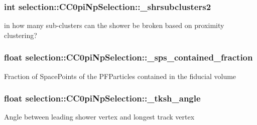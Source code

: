 \subsubsection[{\texorpdfstring{\+\_\+shrsubclusters2}{_shrsubclusters2}}]{\setlength{\rightskip}{0pt plus 5cm}int selection\+::\+C\+C0pi\+Np\+Selection\+::\+\_\+shrsubclusters2\hspace{0.3cm}{\ttfamily [private]}}\hypertarget{classselection_1_1CC0piNpSelection_af7e0f3d1bd6c4335353bd8d4054d4e1e}{}\label{classselection_1_1CC0piNpSelection_af7e0f3d1bd6c4335353bd8d4054d4e1e}
in how many sub-\/clusters can the shower be broken based on proximity clustering? 
\subsubsection[{\texorpdfstring{\+\_\+sps\+\_\+contained\+\_\+fraction}{_sps_contained_fraction}}]{\setlength{\rightskip}{0pt plus 5cm}float selection\+::\+C\+C0pi\+Np\+Selection\+::\+\_\+sps\+\_\+contained\+\_\+fraction\hspace{0.3cm}{\ttfamily [private]}}\hypertarget{classselection_1_1CC0piNpSelection_ac425fa284847d7cae95f21367ed4889e}{}\label{classselection_1_1CC0piNpSelection_ac425fa284847d7cae95f21367ed4889e}
Fraction of Space\+Points of the P\+F\+Particles contained in the fiducial volume 
\subsubsection[{\texorpdfstring{\+\_\+tksh\+\_\+angle}{_tksh_angle}}]{\setlength{\rightskip}{0pt plus 5cm}float selection\+::\+C\+C0pi\+Np\+Selection\+::\+\_\+tksh\+\_\+angle\hspace{0.3cm}{\ttfamily [private]}}\hypertarget{classselection_1_1CC0piNpSelection_a959adc6093ff4d2730dac8f75dd1245c}{}\label{classselection_1_1CC0piNpSelection_a959adc6093ff4d2730dac8f75dd1245c}
Angle between leading shower vertex and longest track vertex 

